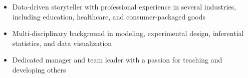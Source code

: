 \begin {cvparagraph}
\begin {itemize}
\itemsep-2mm
\vspace {1.0mm}
\item {Data-driven storyteller with professional experience in several industries, including education, healthcare, and consumer-packaged goods}
\item {Multi-disciplinary background in modeling, experimental design, inferential statistics, and data visualization}
\item {Dedicated manager and team leader with a passion for teaching and developing others}
\end {itemize}
\end {cvparagraph}
